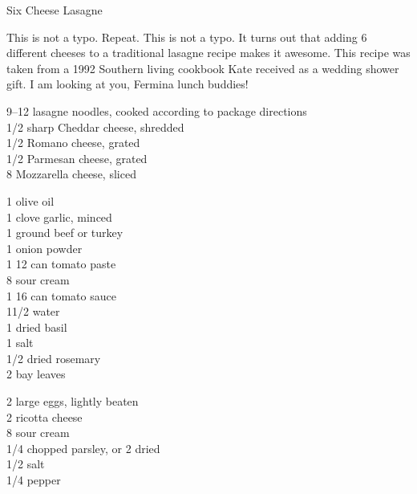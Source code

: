 \begin{entry}{Six Cheese Lasagne}

\begin{open}
  This is not a typo. Repeat. This is not a typo. It turns out that adding 6
  different cheeses to a traditional lasagne recipe makes it awesome. This
  recipe was taken from a 1992 Southern living cookbook Kate received as a
  wedding shower gift. I am looking at you, Fermina lunch buddies!
\end{open}

\begin{ingredients}
\numrange{9}{12} lasagne noodles, cooked according to package directions\\
\SI{1/2}{\cup} sharp Cheddar cheese, shredded\\
\SI{1/2}{\cup} Romano cheese, grated\\
\SI{1/2}{\cup} Parmesan cheese, grated \\
\SI{8}{\ounce} Mozzarella cheese, sliced
\end{ingredients}

\begin{ingredients}
    \SI{1}{\tblspoon} olive oil\\
    1 clove garlic, minced\\
    \SI{1}{\ounce} ground beef or turkey \\
    \SI{1}{\teaspoon} onion powder\\
    1 \SI{12}{\ounce} can tomato paste\\
    \SI{8}{\ounce} sour cream\\
    1 \SI{16}{\ounce} can tomato sauce\\
    1\SI{1/2}{\cup} water\\
    \SI{1}{\tblspoon} dried basil\\
    \SI{1}{\teaspoon} salt\\
    \SI{1/2}{\teaspoon} dried rosemary\\
    2 bay leaves
\end{ingredients}

\begin{ingredients}
    2 large eggs, lightly beaten\\
    \SI{2}{\cup} ricotta cheese\\
    \SI{8}{\ounce} sour cream \\
    \SI{1/4}{\cup} chopped parsley, or \SI{2}{\tblspoon} dried\\
    \SI{1/2}{\teaspoon} salt\\
    \SI{1/4}{\teaspoon} pepper
\end{ingredients}


\end{entry}
